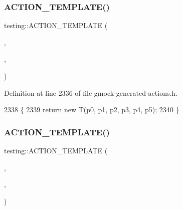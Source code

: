\subsubsection{\texorpdfstring{A\+C\+T\+I\+O\+N\+\_\+\+T\+E\+M\+P\+L\+A\+T\+E()}{ACTION\_TEMPLATE()}\hspace{0.1cm}{\footnotesize\ttfamily [24/28]}}
{\footnotesize\ttfamily testing\+::\+A\+C\+T\+I\+O\+N\+\_\+\+T\+E\+M\+P\+L\+A\+TE (\begin{DoxyParamCaption}\item[{Return\+New}]{,  }\item[{H\+A\+S\+\_\+1\+\_\+\+T\+E\+M\+P\+L\+A\+T\+E\+\_\+\+P\+A\+R\+A\+MS(typename, T)}]{,  }\item[{A\+N\+D\+\_\+6\+\_\+\+V\+A\+L\+U\+E\+\_\+\+P\+A\+R\+A\+MS(p0, p1, p2, p3, p4, p5)}]{ }\end{DoxyParamCaption})}



Definition at line 2336 of file gmock-\/generated-\/actions.\+h.


\begin{DoxyCode}
2338                                                             \{
2339   \textcolor{keywordflow}{return} \textcolor{keyword}{new} T(p0, p1, p2, p3, p4, p5);
2340 \}
\end{DoxyCode}
\mbox{\label{namespacetesting_a7b4cfa09367e9938561eeca5a105d183}} 
\subsubsection{\texorpdfstring{A\+C\+T\+I\+O\+N\+\_\+\+T\+E\+M\+P\+L\+A\+T\+E()}{ACTION\_TEMPLATE()}\hspace{0.1cm}{\footnotesize\ttfamily [25/28]}}
{\footnotesize\ttfamily testing\+::\+A\+C\+T\+I\+O\+N\+\_\+\+T\+E\+M\+P\+L\+A\+TE (\begin{DoxyParamCaption}\item[{Return\+New}]{,  }\item[{H\+A\+S\+\_\+1\+\_\+\+T\+E\+M\+P\+L\+A\+T\+E\+\_\+\+P\+A\+R\+A\+MS(typename, T)}]{,  }\item[{A\+N\+D\+\_\+7\+\_\+\+V\+A\+L\+U\+E\+\_\+\+P\+A\+R\+A\+MS(p0, p1, p2, p3, p4, p5, p6)}]{ }\end{DoxyParamCaption})}




